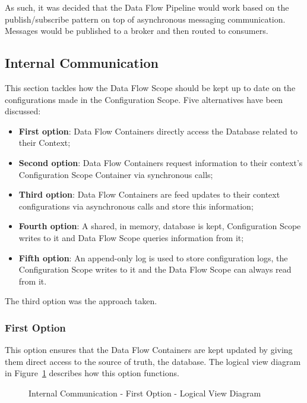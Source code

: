 As such, it was decided that the Data Flow Pipeline would work based on the publish/subscribe pattern on top of asynchronous messaging communication. Messages would be published to a broker and then routed to consumers.

\subsection{Internal Communication}
\label{subsec:design:alternatives:internal}

This section tackles how the Data Flow Scope should be kept up to date on the configurations made in the Configuration Scope. Five alternatives have been discussed:

\begin{itemize}
   \item \textbf{First option}: Data Flow Containers directly access the Database related to their Context;
   \item \textbf{Second option}: Data Flow Containers request information to their context's Configuration Scope Container via synchronous calls;
   \item \textbf{Third option}: Data Flow Containers are feed updates to their context configurations via asynchronous calls and store this information;
   \item \textbf{Fourth option}: A shared, in memory, database is kept, Configuration Scope writes to it and Data Flow Scope queries information from it;
   \item \textbf{Fifth option}: An append-only log is used to store configuration logs, the Configuration Scope writes to it and the Data Flow Scope can always read from it.  
\end{itemize}

The third option was the approach taken.

\subsubsection{First Option}
\label{subsubsec:design:alternatives:internal:first}

This option ensures that the Data Flow Containers are kept updated by giving them direct access to the source of truth, the database. The logical view diagram in Figure~\ref{fig:design:alternatives:internal:first:diagram} describes how this option functions.

\begin{figure}[H]
   \centering
   \resizebox{\columnwidth}{!}
   {
      
   }
   \caption[Internal Communication - First Option - Logical View Diagram]{Internal Communication - First Option - Logical View Diagram}
   \label{fig:design:alternatives:internal:first:diagram}
\end{figure}

